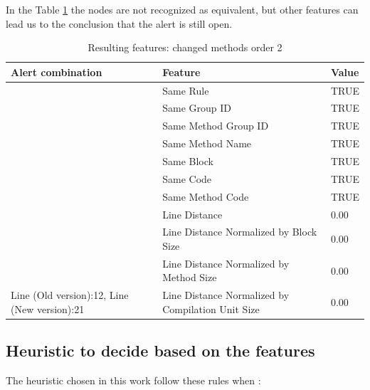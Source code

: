\documentclass[
]{article}
\begin{document}
\newpage

In the Table \ref{changing_method_order_2} the nodes are not recognized
as equivalent, but other features can lead us to the conclusion that the
alert is still open.

\small

\begin{table}[!h]

\caption{\label{tab:unnamed-chunk-18}Resulting features: changed methods order 2 \label{changing_method_order_2} }
\centering
\begin{tabular}[t]{l|l|l}
\hline
Alert combination & Feature & Value\\
\hline
\rowcolor{gray!6}   & Same Rule & TRUE\\

 & Same Group ID & TRUE\\

\rowcolor{gray!6}   & Same Method Group ID & TRUE\\

 & Same Method Name & TRUE\\

\rowcolor{gray!6}   & Same Block & TRUE\\

 & Same Code & TRUE\\

\rowcolor{gray!6}   & Same Method Code & TRUE\\

 & Line Distance & 0.00\\

\rowcolor{gray!6}   & Line Distance Normalized by Block Size & 0.00\\

 & Line Distance Normalized by Method Size & 0.00\\

\multirow[t]{-11}{*}{\raggedright\arraybackslash Line (Old version):12, Line (New version):21} & Line Distance Normalized by Compilation Unit Size & 0.00\\
\hline
\end{tabular}
\end{table}

\normalsize

\subsection{Heuristic to decide based on the features}\label{heuristic}

The heuristic chosen in this work follow these rules when :
\end{document}
